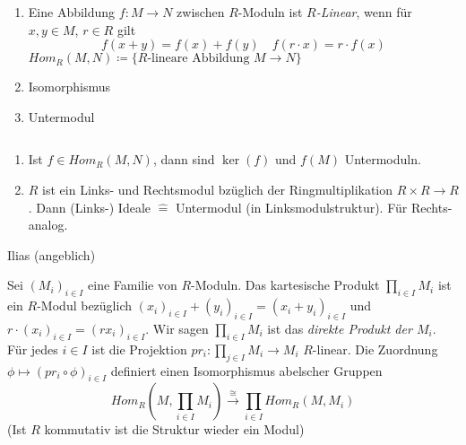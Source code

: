\documentclass[../main.tex]{subfiles}
\begin{document}
\begin{definition}$ $
    \begin{enumerate}[label=(\alph*)]
        \item Eine Abbildung $f:M\rightarrow N$ zwischen $R$-Moduln ist \emph{$R$-Linear}, wenn für $x,y\in M$, $r\in R$ gilt
        $$f(x+y) = f(x) + f(y) \quad f(r\cdot x) = r\cdot f(x)$$
        $Hom_R(M,N) \coloneqq \{\text{$R$-lineare Abbildung $M\rightarrow N$}\}$
        \item Isomorphismus
        \item Untermodul
    \end{enumerate}
\end{definition}
\begin{example} $ $
    \begin{enumerate}[label=(\alph*)]
        \item Ist $f\in Hom_R(M,N)$, dann sind $\ker(f)$ und $f(M)$ Untermoduln.
        \item $R$ ist ein Links- und Rechtsmodul bzüglich der Ringmultiplikation $R\times R \rightarrow R$. Dann (Links-) Ideale $\hat{=}$ Untermodul (in Linksmodulstruktur). Für Rechts- analog.
    \end{enumerate}
\end{example}

Ilias (angeblich)

\setcounter{theorem}{8}
\begin{definition}
    Sei $(M_i)_{i\in I}$ eine Familie von $R$-Moduln. Das kartesische Produkt $\prod_{i\in I} M_i$ ist ein $R$-Modul bezüglich $(x_i)_{i\in I} + (y_i)_{i\in I} = (x_i + y_i)_{i\in I}$ und $r\cdot (x_i)_{i\in I} = (rx_i)_{i\in I}$.
    Wir sagen $\prod_{i\in I} M_i$ ist das \emph{direkte Produkt der $M_i$}. Für jedes $i\in I$ ist die Projektion $pr_i: \prod_{j\in I} M_i \rightarrow M_i$ $R$-linear.
    Die Zuordnung $\phi\mapsto (pr_i \circ \phi)_{i\in I}$ definiert einen Isomorphismus abelscher Gruppen
    $$Hom_R(M,\prod_{i\in I} M_i)\overset{\cong}{\rightarrow} \prod_{i\in I} Hom_R(M,M_i)$$
    (Ist $R$ kommutativ ist die Struktur wieder ein Modul)
\end{definition}
\begin{remark*}
\end{remark*}
\end{document}
